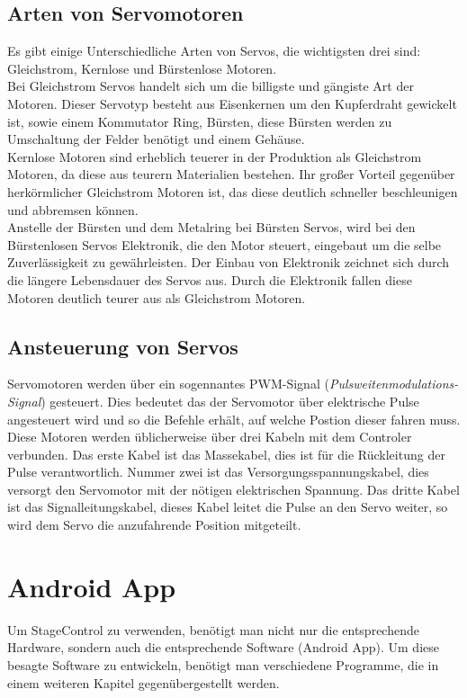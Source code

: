\subsection{Arten von Servomotoren}
Es gibt einige Unterschiedliche Arten von Servos, die wichtigsten drei sind: Gleichstrom, Kernlose und Bürstenlose Motoren. \\
Bei Gleichstrom Servos handelt sich um die billigste und gängiste Art der Motoren. Dieser Servotyp besteht aus Eisenkernen um den Kupferdraht gewickelt ist, sowie einem Kommutator Ring, Bürsten, diese Bürsten werden zu Umschaltung der Felder benötigt und einem Gehäuse. \\
Kernlose Motoren sind erheblich teuerer in der Produktion als Gleichstrom Motoren, da diese aus teurern Materialien bestehen. Ihr großer Vorteil gegenüber herkörmlicher Gleichstrom Motoren ist, das diese deutlich schneller beschleunigen und abbremsen können. \\
Anstelle der Bürsten und dem Metalring bei Bürsten Servos, wird bei den Bürstenlosen Servos Elektronik, die den Motor steuert, eingebaut um die selbe Zuverlässigkeit zu gewährleisten. Der Einbau von Elektronik zeichnet sich durch die längere Lebensdauer des Servos aus. Durch die Elektronik fallen diese Motoren deutlich teurer aus als Gleichstrom Motoren. \\
\cite{Servomotor_Arten}


\subsection{Ansteuerung von Servos}
Servomotoren werden über ein sogennantes PWM-Signal (\emph{Pulsweitenmodulations-Signal}) gesteuert. Dies bedeutet das der Servomotor über elektrische Pulse angesteuert wird und so die Befehle erhält, auf welche Postion dieser fahren muss. Diese Motoren werden üblicherweise über drei Kabeln mit dem Controler verbunden. Das erste Kabel ist das Massekabel, dies ist für die Rückleitung der Pulse verantwortlich. Nummer zwei ist das Versorgungsspannungskabel, dies versorgt den Servomotor mit der nötigen elektrischen Spannung. Das dritte Kabel ist das Signalleitungskabel, dieses Kabel leitet die Pulse an den Servo weiter, so wird dem Servo die anzufahrende Position mitgeteilt.\\
\cite{Servomotor_Ansteuerung}




\section{Android App}
Um StageControl zu verwenden, benötigt man nicht nur die entsprechende Hardware, sondern auch die entsprechende Software (Android App). Um diese besagte Software zu entwickeln, benötigt man verschiedene Programme, die in einem weiteren Kapitel gegenübergestellt werden.

